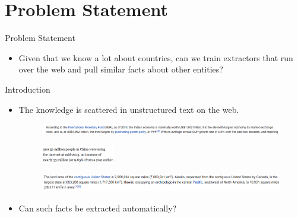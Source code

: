 \documentclass{beamer}
\begin{document}
\section{Problem Statement}
\begin{frame}{Problem Statement}
 \begin{itemize}
  \item Given that we know a lot about countries, can we train extractors that run over the web and pull similar facts about other entities?
 \end{itemize}
\end{frame}
\begin{frame}{Introduction}

\begin{itemize}
 
 \item  The knowledge is scattered in unstructured text on the web.
 
  \begin{figure}
    \centering
    \includegraphics[width = 1.0\textwidth]{images/ex_1}
  \end{figure}
  
  \begin{figure}
    \centering
    \includegraphics[width = 0.3\textwidth]{images/ex_2}
  \end{figure}
  
    \begin{figure}
    \centering
    \includegraphics[width = 1.0\textwidth]{images/ex_3}
  \end{figure}
  

  \item Can such facts be extracted automatically?
\end{itemize}

\end{frame}
\end{document}
